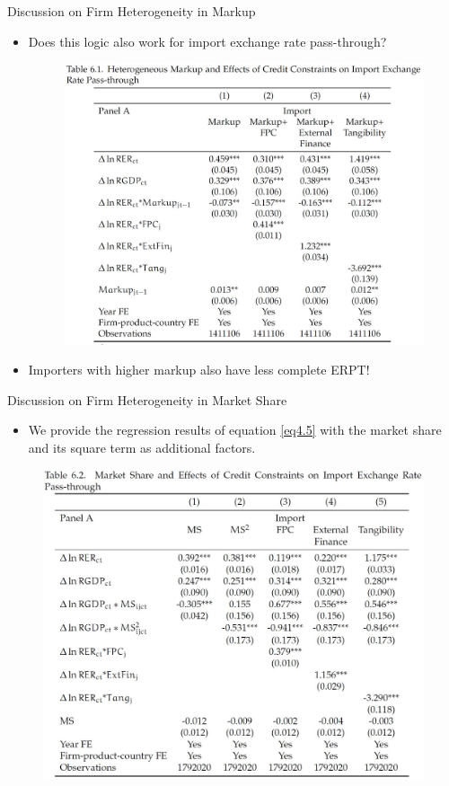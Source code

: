 \documentclass[10pt]{beamer}
\begin{document}
\begin{frame}{Discussion on Firm Heterogeneity in Markup}
	\begin{itemize}
		\item Does this logic also work for import exchange rate pass-through?
	\begin{figure}[htbp]
		\centering
		\includegraphics[width=0.75\columnwidth]{Table6.1.jpg}
		\label{tab6.1}
	\end{figure}
		\item Importers with higher markup also have less complete ERPT!
	\end{itemize}	
\end{frame}

\begin{frame}{Discussion on Firm Heterogeneity in Market Share}
	\begin{itemize}
		\item We provide the regression results of equation \ref{eq4.5} with the market share and its square term as additional factors.
	\end{itemize}
	\begin{figure}[htbp]
		\centering
		\includegraphics[width=0.8\columnwidth]{Table6.2.jpg}
		\label{tab6.2}
	\end{figure}
\end{frame}
\end{document}
